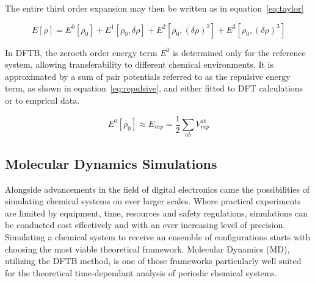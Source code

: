 \documentclass[12pt]{article}
\begin{document}
\bigskip

The entire third order expansion may then be written as in equation~\ref{eq:taylor}

\begin{equation}
  E[\rho] = E^{0}[\rho_0] + E^1[\rho_0, \delta\rho] + E^2[\rho_0, (\delta\rho)^2] + E^3[\rho_0, (\delta\rho)^3]
  \label{eq:taylor}
\end{equation}

\bigskip

\noindent In DFTB, the zeroeth order energy term $E^0$ is determined only for the reference system, allowing transferability to different chemical environments.
It is approximated by a sum of pair potentials referred to as the repulsive energy term, as shown in equation~\ref{eq:repulsive}, and either fitted to DFT calculations or to emprical data.

\begin{equation}
  E^{0}[\rho_0] \approx E_{rep} = \frac{1}{2} \sum_{ab}^{}V_{rep}^{ab}
  \label{eq:repulsive}
\end{equation}



\subsection{Molecular Dynamics Simulations}
Alongside advancements in the field of digital electronics came the possibilities of simulating chemical 
systems on ever larger scales. Where practical experiments are limited by equipment, time, resources and safety regulations, 
simulations can be conducted cost effectively and with an ever increasing level of precision.
Simulating a chemical system to receive an ensemble of configurations starts with choosing the most viable
theoretical framework. Molecular Dynamics (MD), utilizing the DFTB method, is one of those frameworks particularly well suited for  
the theoretical time-dependant analysis of periodic chemical systems. 


\end{document}
